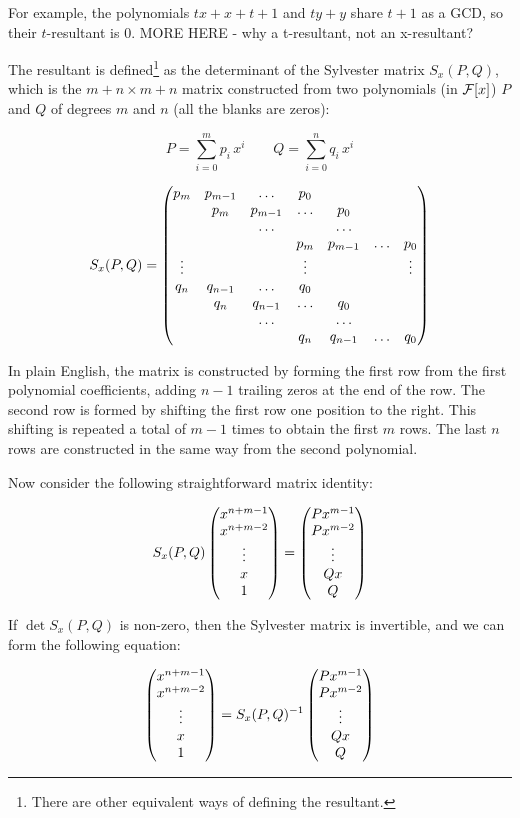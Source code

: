 For example, the polynomials $t x+x+t+1$ and $ty + y$ share $t+1$
as a GCD, so their $t$-resultant is 0.  MORE HERE - why a t-resultant,
not an x-resultant?

The resultant is defined\footnote{There are other equivalent ways of
defining the resultant.} as the determinant of the Sylvester matrix
$S_x(P,Q)$, which is the $m+n \times m+n$ matrix constructed from two
polynomials (in ${\cal F}[x]$) $P$ and $Q$ of degrees $m$ and $n$ (all
the blanks are zeros):

$$ P = \sum_{i=0}^m p_i \, x^i \qquad Q = \sum_{i=0}^n q_i \, x^i $$

$$ S_x(P,Q) = \begin{pmatrix}
  p_m & p_{m-1} & \ldots & p_0 & & & \cr
  & p_m & p_{m-1} & \ldots & p_0 & & \cr
  & & \ldots & & \ldots & & \cr
  & & & p_m & p_{m-1} & \ldots & p_0 \cr
  \vdots & & & \vdots & & & \vdots \cr
  q_n & q_{n-1} & \ldots & q_0 & & & \cr
  & q_n & q_{n-1} & \ldots & q_0 & & \cr
  & & \ldots & & \ldots & & \cr
  & & & q_n & q_{n-1} & \ldots & q_0 \cr
  \end{pmatrix} $$

In plain English, the matrix is constructed by forming the first row
from the first polynomial coefficients, adding $n-1$ trailing zeros at
the end of the row.  The second row is formed by shifting the first
row one position to the right.  This shifting is repeated a total of
$m-1$ times to obtain the first $m$ rows.  The last $n$ rows are
constructed in the same way from the second polynomial.

Now consider the following straightforward matrix identity:

$$ S_x(P,Q) \begin{pmatrix}x^{n+m-1}\cr x^{n+m-2}\cr \vdots \cr x \cr 1\end{pmatrix}
 = \begin{pmatrix}P x^{m-1}\cr P x^{m-2}\cr \vdots \cr Q x \cr Q\end{pmatrix} $$

If $\det S_x(P,Q)$ is non-zero, then the Sylvester matrix is
invertible, and we can form the following equation:

$$ \begin{pmatrix}x^{n+m-1}\cr x^{n+m-2}\cr \vdots \cr x \cr 1\end{pmatrix}
 = S_x(P,Q)^{-1} \begin{pmatrix}P x^{m-1}\cr P x^{m-2}\cr \vdots \cr Q x \cr Q\end{pmatrix} $$

